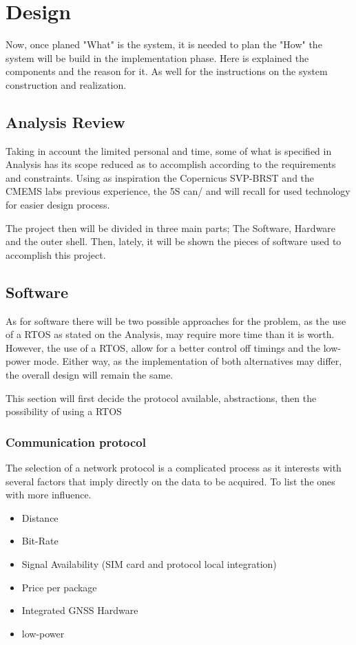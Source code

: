 \chapter{Design}
Now, once planed "What" is the system, it is needed to plan the "How" the system will be build in 
the implementation phase. Here is explained the components and the reason for it. As well
for the instructions on the system construction and realization.

\section{Analysis Review}

Taking in account the limited personal and time, some of what is specified in Analysis
has its scope reduced as to accomplish according to the requirements and constraints.
Using as inspiration the Copernicus SVP-BRST and the CMEMS labs previous experience,
the 5S can/ and will recall for used technology for easier design process.

The project then will be divided in three main parts; The Software, Hardware and the outer shell.
Then, lately, it will be shown the pieces of software used to accomplish this project. 

\section{Software}

As for software there will be two possible approaches for the problem, as the use of a RTOS
as stated on the Analysis, may require more time than it is worth. However, the use of a
RTOS, allow for a better control off timings and the low-power mode. Either way, as the
implementation of both alternatives may differ, the overall design will remain the same. 

This section will first decide the protocol available, abstractions, then the possibility of using a RTOS

\subsection{Communication protocol}

The selection of a network protocol is a complicated process as it interests with several
factors that imply directly on the data to be acquired. To list the ones with more influence.

\begin{itemize}
    \item Distance
    \item Bit-Rate
    \item Signal Availability (SIM card and protocol local integration)
    \item Price per package
    \item Integrated GNSS Hardware
    \item low-power
\end{itemize}

